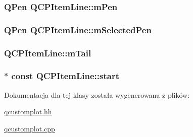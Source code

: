 \subsubsection[{\texorpdfstring{m\+Pen}{mPen}}]{\setlength{\rightskip}{0pt plus 5cm}Q\+Pen Q\+C\+P\+Item\+Line\+::m\+Pen\hspace{0.3cm}{\ttfamily [protected]}}\hypertarget{class_q_c_p_item_line_abbb544d5bb927dfe4e81a7f3ca4c65ac}{}\label{class_q_c_p_item_line_abbb544d5bb927dfe4e81a7f3ca4c65ac}
\subsubsection[{\texorpdfstring{m\+Selected\+Pen}{mSelectedPen}}]{\setlength{\rightskip}{0pt plus 5cm}Q\+Pen Q\+C\+P\+Item\+Line\+::m\+Selected\+Pen\hspace{0.3cm}{\ttfamily [protected]}}\hypertarget{class_q_c_p_item_line_aff858ad6dde3b90024814ca4b116f278}{}\label{class_q_c_p_item_line_aff858ad6dde3b90024814ca4b116f278}
\subsubsection[{\texorpdfstring{m\+Tail}{mTail}}]{ Q\+C\+P\+Item\+Line\+::m\+Tail\hspace{0.3cm}{\ttfamily [protected]}}\hypertarget{class_q_c_p_item_line_ab8ed61dfe15bbb1cbf9b95eae95e242f}{}\label{class_q_c_p_item_line_ab8ed61dfe15bbb1cbf9b95eae95e242f}
\subsubsection[{\texorpdfstring{start}{start}}]{$\ast$ const Q\+C\+P\+Item\+Line\+::start}\hypertarget{class_q_c_p_item_line_a602da607a09498b0f152ada1d6851bc5}{}\label{class_q_c_p_item_line_a602da607a09498b0f152ada1d6851bc5}


Dokumentacja dla tej klasy została wygenerowana z plików\+:\begin{DoxyCompactItemize}
\item 
\hyperlink{qcustomplot_8hh}{qcustomplot.\+hh}\item 
\hyperlink{qcustomplot_8cpp}{qcustomplot.\+cpp}\end{DoxyCompactItemize}
